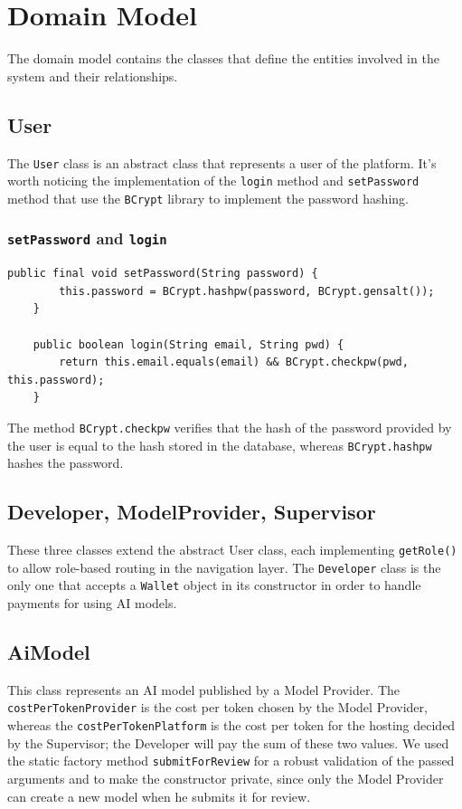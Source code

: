 \documentclass[a4paper,11pt]{report}
\begin{document}
	\section{Domain Model}
	\label{sec:DomainModel}
	The domain model contains the classes that define the entities involved in the system and their relationships.
	\subsection{User}
	The \texttt{User} class is an abstract class that represents a user of the platform. It's worth noticing 
	the implementation of the \texttt{login} method and \texttt{setPassword} method that use the \texttt{BCrypt} library to implement the password hashing.
	\subsubsection{\texttt{setPassword} and \texttt{login}}
	\begin{lstlisting}[label={lst:userauth}]
	public final void setPassword(String password) {
		this.password = BCrypt.hashpw(password, BCrypt.gensalt());
	}
	
	public boolean login(String email, String pwd) {
		return this.email.equals(email) && BCrypt.checkpw(pwd, this.password);
	}
	\end{lstlisting}
	The method \texttt{BCrypt.checkpw} verifies that the hash of the password provided by the user is equal to the hash stored in the database,
	whereas \texttt{BCrypt.hashpw} hashes the password.
	
	
	\subsection{Developer, ModelProvider, Supervisor}
	These three classes extend the abstract User class, each implementing \texttt{getRole()} to allow role-based routing in the navigation layer. 
	The \texttt{Developer} class is the only one that accepts a \texttt{Wallet} object in its constructor in order to handle payments for using AI models.
	
	\subsection{AiModel}
	This class represents an AI model published by a Model Provider. 
	The \texttt{costPerTokenProvider} is the cost per token chosen by the Model Provider, whereas the \texttt{costPerTokenPlatform} is the cost per token for the hosting decided by the Supervisor; the Developer will pay the sum of these two values.
	We used the static factory method \texttt{submitForReview} for a robust validation of the passed arguments and to make the constructor private, since only the Model Provider can create a new model when he submits it for review.
	\clearpage
\end{document}
